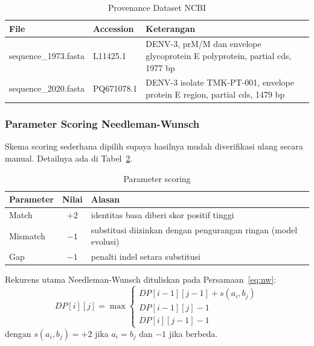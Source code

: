 \documentclass[conference]{IEEEtran}
\begin{document}
\begin{table}[h]
\centering
\caption{Provenance Dataset NCBI}
\label{tab:dataset}
\renewcommand{\arraystretch}{1.1}
\begin{tabular}{p{} p{} p{}}
\toprule
\textbf{File} & \textbf{Accession} & \textbf{Keterangan} \\
\midrule
sequence\_\-1973.fasta & L11425.1 & DENV-3, prM/M dan envelope glycoprotein E polyprotein, partial cds, 1977 bp \\
sequence\_\-2020.fasta & PQ671078.1 & DENV-3 isolate TMK-PT-001, envelope protein E region, partial cds, 1479 bp \\
\bottomrule
\end{tabular}
\end{table}

\subsubsection{Parameter Scoring Needleman-Wunsch}
Skema scoring sederhana dipilih supaya hasilnya mudah diverifikasi ulang secara manual. Detailnya ada di Tabel~\ref{tab:scoring}.

\begin{table}[h]
\centering
\caption{Parameter scoring}
\label{tab:scoring}
\renewcommand{\arraystretch}{1.1}
\begin{tabular}{p{} c p{}}
\toprule
\textbf{Parameter} & \textbf{Nilai} & \textbf{Alasan} \\
\midrule
Match    & $+2$ & identitas basa diberi skor positif tinggi \\
Mismatch & $-1$ & substitusi diizinkan dengan pengurangan ringan (model evolusi) \\
Gap      & $-1$ & penalti indel setara substitusi \\
\bottomrule
\end{tabular}
\end{table}

Rekurens utama Needleman-Wunsch \cite{needleman1970} dituliskan pada Persamaan~\eqref{eq:nw}:
\begin{equation}
DP[i][j] = \max
\begin{cases}
DP[i-1][j-1] + s(a_i, b_j) \\
DP[i-1][j] - 1 \\
DP[i][j-1] - 1
\end{cases}
\label{eq:nw}
\end{equation}
dengan $s(a_i, b_j) = +2$ jika $a_i = b_j$ dan $-1$ jika berbeda.
\end{document}

